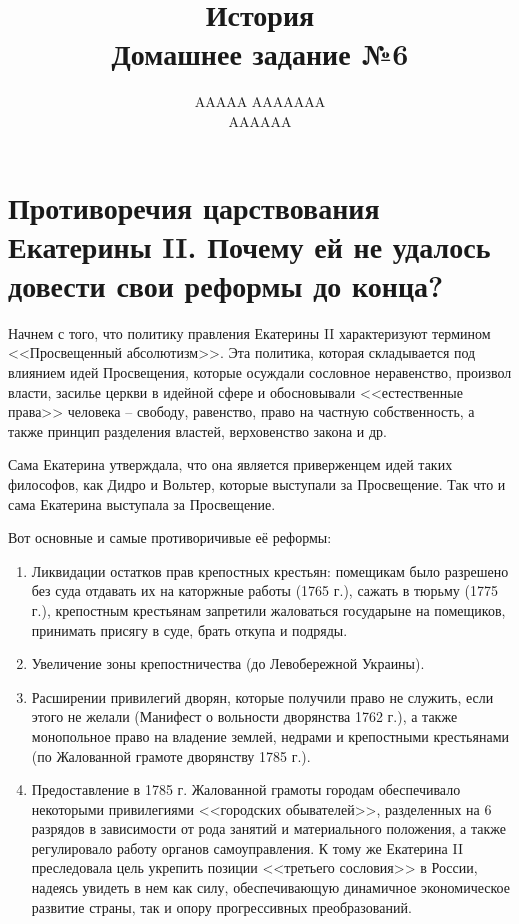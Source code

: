 \documentclass[12pt]{article}
\title{История \\ Домашнее задание №6}
\author{AAAAA AAAAAAA \\ AAAAAA}
\begin{document}
  \maketitle

  \section{Противоречия царствования Екатерины II. Почему ей не удалось довести свои реформы до конца?}
  Начнем с того, что политику правления Екатерины II характеризуют термином <<Просвещенный абсолютизм>>.
  Эта политика, которая складывается под влиянием идей Просвещения,
  которые осуждали сословное неравенство, произвол власти,
  засилье церкви в идейной сфере и обосновывали <<естественные права>> человека -- свободу,
  равенство, право на частную собственность, а также принцип разделения властей, верховенство закона и др.

  Сама Екатерина утверждала, что она является приверженцем идей таких философов, как Дидро и Вольтер, которые выступали за Просвещение.
  Так что и сама Екатерина выступала за Просвещение.

  Вот основные и самые противоричивые её реформы:
  \begin{enumerate}
    \item
    Ликвидации остатков прав крепостных крестьян:
    помещикам было разрешено без суда отдавать их на каторжные работы (1765 г.), сажать в тюрьму (1775 г.),
    крепостным крестьянам запретили жаловаться государыне на помещиков, принимать присягу в суде, брать откупа и подряды.

    \item
    Увеличение зоны крепостничества (до Левобережной Украины).

    \item
    Расширении привилегий дворян, которые получили право не служить, если этого не желали (Манифест о вольности дворянства 1762 г.),
    а также монопольное право на владение землей, недрами и крепостными крестьянами (по Жалованной грамоте дворянству 1785 г.).

    \item
    Предоставление в 1785 г. Жалованной грамоты городам обеспечивало некоторыми привилегиями <<городских обывателей>>,
    разделенных на 6 разрядов в зависимости от рода занятий и материального положения, а также регулировало работу органов самоуправления.
    К тому же Екатерина II преследовала цель укрепить позиции <<третьего сословия>> в России,
    надеясь увидеть в нем как силу, обеспечивающую динамичное экономическое развитие страны, так и опору прогрессивных преобразований.
  \end{enumerate}
\end{document}
